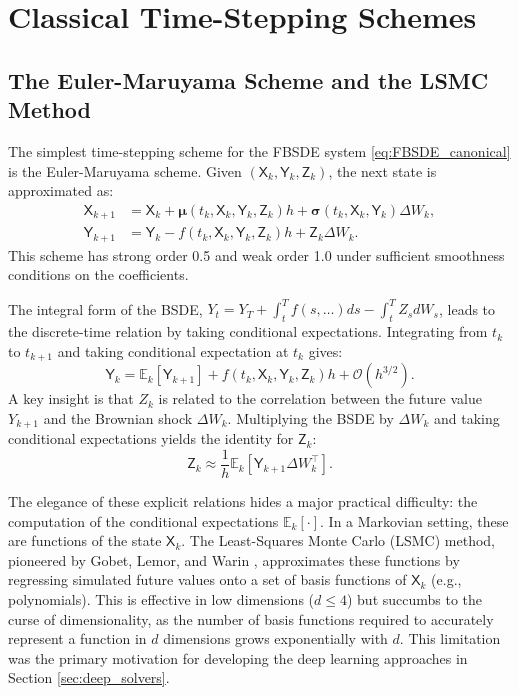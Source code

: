 \section{Classical Time-Stepping Schemes}
\label{sec:classical}

\subsection{The Euler-Maruyama Scheme and the LSMC Method}
\label{sec:euler_picard}

\begin{definition}
The simplest time-stepping scheme for the FBSDE system \eqref{eq:FBSDE_canonical} is the Euler-Maruyama scheme. Given $(\mathsf{X}_k, \mathsf{Y}_k, \mathsf{Z}_k)$, the next state is approximated as:
\begin{align*}
\mathsf{X}_{k+1} &= \mathsf{X}_k + \bm{\mu}(t_k, \mathsf{X}_k, \mathsf{Y}_k, \mathsf{Z}_k)h + \bm{\sigma}(t_k, \mathsf{X}_k, \mathsf{Y}_k)\Delta W_k, \\
\mathsf{Y}_{k+1} &= \mathsf{Y}_k - f(t_k, \mathsf{X}_k, \mathsf{Y}_k, \mathsf{Z}_k)h + \mathsf{Z}_k \Delta W_k.
\end{align*}
This scheme has strong order 0.5 and weak order 1.0 under sufficient smoothness conditions on the coefficients.
\end{definition}

\begin{proposition}
The integral form of the BSDE, \(Y_t = Y_T + \int_t^T f(s,\dots)ds - \int_t^T Z_s dW_s\), leads to the discrete-time relation by taking conditional expectations. Integrating from $t_k$ to $t_{k+1}$ and taking conditional expectation at $t_k$ gives:
\[
\mathsf{Y}_k = \mathbb{E}_k[\mathsf{Y}_{k+1}] + f(t_k, \mathsf{X}_k, \mathsf{Y}_k, \mathsf{Z}_k)h + \mathcal{O}(h^{3/2}).
\]
A key insight is that \(Z_k\) is related to the correlation between the future value \(Y_{k+1}\) and the Brownian shock \(\Delta W_k\). Multiplying the BSDE by \(\Delta W_k\) and taking conditional expectations yields the identity for \(\mathsf{Z}_k\):
\[
\mathsf{Z}_k \approx \frac{1}{h}\mathbb{E}_k[\mathsf{Y}_{k+1} \Delta W_k^\top].
\]
\end{proposition}

\begin{remark}
The elegance of these explicit relations hides a major practical difficulty: the computation of the conditional expectations \(\mathbb{E}_k[\cdot]\). In a Markovian setting, these are functions of the state \(\mathsf{X}_k\). The Least-Squares Monte Carlo (LSMC) method, pioneered by Gobet, Lemor, and Warin \cite{Gobet2005}, approximates these functions by regressing simulated future values onto a set of basis functions of \(\mathsf{X}_k\) (e.g., polynomials). This is effective in low dimensions (\(d \le 4\)) but succumbs to the curse of dimensionality, as the number of basis functions required to accurately represent a function in \(d\) dimensions grows exponentially with \(d\). This limitation was the primary motivation for developing the deep learning approaches in Section \ref{sec:deep_solvers}.
\end{remark}

